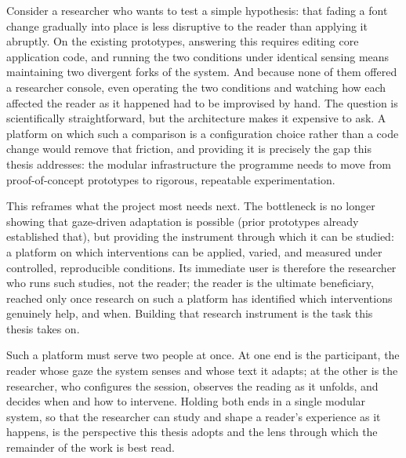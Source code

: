 Consider a researcher who wants to test a simple hypothesis: that fading a font change gradually into place is less disruptive to the reader than applying it abruptly.
On the existing prototypes, answering this requires editing core application code, and running the two conditions under identical sensing means maintaining two divergent forks of the system.
And because none of them offered a researcher console, even operating the two conditions and watching how each affected the reader as it happened had to be improvised by hand.
The question is scientifically straightforward, but the architecture makes it expensive to ask.
A platform on which such a comparison is a configuration choice rather than a code change would remove that friction, and providing it is precisely the gap this thesis addresses: the modular infrastructure the programme needs to move from proof-of-concept prototypes to rigorous, repeatable experimentation.

This reframes what the project most needs next.
The bottleneck is no longer showing that gaze-driven adaptation is possible (prior prototypes already established that), but providing the instrument through which it can be studied: a platform on which interventions can be applied, varied, and measured under controlled, reproducible conditions.
Its immediate user is therefore the researcher who runs such studies, not the reader; the reader is the ultimate beneficiary, reached only once research on such a platform has identified which interventions genuinely help, and when.
Building that research instrument is the task this thesis takes on.

Such a platform must serve two people at once.
At one end is the participant, the reader whose gaze the system senses and whose text it adapts; at the other is the researcher, who configures the session, observes the reading as it unfolds, and decides when and how to intervene.
Holding both ends in a single modular system, so that the researcher can study and shape a reader's experience as it happens, is the perspective this thesis adopts and the lens through which the remainder of the work is best read.
